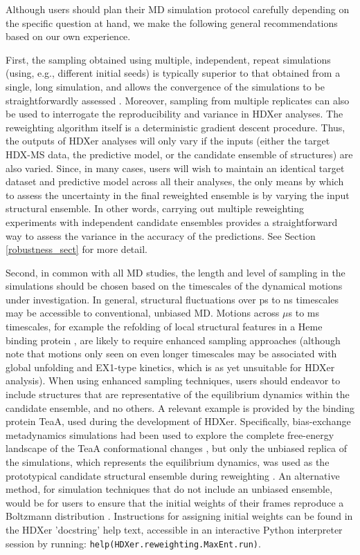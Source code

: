 \documentclass[9pt,tutorial,ASAPversion]{livecoms}
\begin{document}
Although users should plan their MD simulation protocol carefully depending on the specific question at hand, we make the following general recommendations based on our own experience.

First, the sampling obtained using multiple, independent, repeat simulations (using, e.g., different initial seeds) is typically superior to that obtained from a single, long simulation, and allows the convergence of the simulations to be straightforwardly assessed \cite{Hess2002,Faraldo-Gomez2004,Grossfield2019}. 
Moreover, sampling from multiple replicates can also be used to interrogate the reproducibility and variance in HDXer analyses.
The reweighting algorithm itself is a deterministic gradient descent procedure.
Thus, the outputs of HDXer analyses will only vary if the inputs (either the target HDX-MS data, the predictive model, or the candidate ensemble of structures) are also varied.
Since, in many cases, users will wish to maintain an identical target dataset and predictive model across all their analyses, the only means by which to assess the uncertainty in the final reweighted ensemble is by varying the input structural ensemble.
In other words, carrying out multiple reweighting experiments with independent candidate ensembles provides a straightforward way to assess the variance in the accuracy of the predictions. 
See Section \ref{robustness_sect} for more detail.

Second, in common with all MD studies, the length and level of sampling in the simulations should be chosen based on the timescales of the dynamical motions under investigation. 
In general, structural fluctuations over ps to ns timescales may be accessible to conventional, unbiased MD. 
Motions across $\mu$s to ms timescales, for example the refolding of local structural features in a Heme binding protein \cite{Kihn2021}, are likely to require enhanced sampling approaches \cite{Allison2020} (although note that motions only seen on even longer timescales may be associated with global unfolding and EX1-type kinetics, which is as yet unsuitable for HDXer analysis). 
When using enhanced sampling techniques, users should endeavor to include structures that are representative of the equilibrium dynamics within the candidate ensemble, and no others. 
A relevant example is provided by the binding protein TeaA, used during the development of HDXer.
Specifically, bias-exchange metadynamics simulations had been used to explore the complete free-energy landscape of the TeaA conformational changes \cite{Marinelli2011}, but only the unbiased replica of the simulations, which represents the equilibrium dynamics, was used as the prototypical candidate structural ensemble during reweighting \cite{Bradshaw2020}.
An alternative method, for simulation techniques that do not include an unbiased ensemble, would be for users to ensure that the initial weights of their frames reproduce a Boltzmann distribution \cite{Torrie1977, Marinelli2021}.
Instructions for assigning initial weights can be found in the HDXer 'docstring' help text, accessible in an interactive Python interpreter session by running:  \texttt{help(HDXer.reweighting.MaxEnt.run)}.
\end{document}
